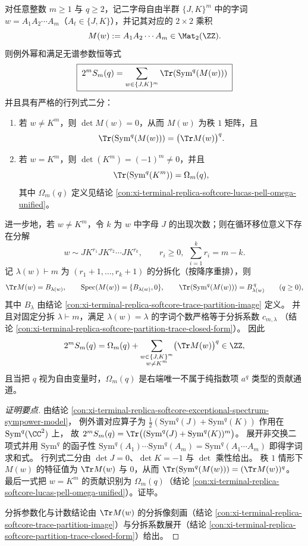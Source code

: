 \begin{conclusion}\label{con:xi-terminal-replica-softcore-exceptional-power-sum-word-trace-sympower}
对任意整数 \(m\ge 1\) 与 \(q\ge 2\)，记二字母自由半群 \(\{J,K\}^m\) 中的字词
\(w=A_1A_2\cdots A_m\)（\(A_t\in\{J,K\}\)），并记其对应的 \(2\times 2\) 乘积
\[
M(w):=A_1A_2\cdots A_m\in \Mat_{2}(\ZZ).
\]
则例外幂和满足无谱参数恒等式
\[
\boxed{\;
2^m S_m(q)=\sum_{w\in\{J,K\}^m}\Tr\!\left(\mathrm{Sym}^q(M(w))\right)\;}
\]
并且具有严格的行列式二分：
\begin{enumerate}
  \item 若 \(w\neq K^m\)，则 \(\det M(w)=0\)，从而 \(M(w)\) 为秩 \(1\) 矩阵，且
  \[
  \Tr\!\left(\mathrm{Sym}^q(M(w))\right)=\bigl(\Tr M(w)\bigr)^q.
  \]
  \item 若 \(w=K^m\)，则 \(\det(K^m)=(-1)^m\neq 0\)，并且
  \[
  \Tr\!\left(\mathrm{Sym}^q(K^m)\right)=\Omega_m(q),
  \]
  其中 \(\Omega_m(q)\) 定义见结论 \ref{con:xi-terminal-replica-softcore-lucas-pell-omega-unified}。
\end{enumerate}
进一步地，若 \(w\neq K^m\)，令 \(k\) 为 \(w\) 中字母 \(J\) 的出现次数；则在循环移位意义下存在分解
\[
w\sim JK^{r_1}JK^{r_2}\cdots JK^{r_k},
\qquad
r_i\ge 0,\ \ \sum_{i=1}^{k}r_i=m-k.
\]
记 \(\lambda(w)\vdash m\) 为 \((r_1+1,\dots,r_k+1)\) 的分拆化（按降序重排），则
\[
\Tr M(w)=B_{\lambda(w)},
\qquad
\mathrm{Spec}(M(w))=\{B_{\lambda(w)},0\},
\qquad
\Tr\!\left(\mathrm{Sym}^q(M(w))\right)=B_{\lambda(w)}^{\,q}\qquad(q\ge 0),
\]
其中 \(B_\lambda\) 由结论 \ref{con:xi-terminal-replica-softcore-trace-partition-image} 定义。
并且对固定分拆 \(\lambda\vdash m\)，满足 \(\lambda(w)=\lambda\) 的字词个数严格等于分拆系数 \(c_{m,\lambda}\)
（结论 \ref{con:xi-terminal-replica-softcore-partition-trace-closed-form}）。
因此
\[
2^m S_m(q)=\Omega_m(q)+\sum_{\substack{w\in\{J,K\}^m\\ w\neq K^m}}\bigl(\Tr M(w)\bigr)^q\in\ZZ,
\]
且当把 \(q\) 视为自由变量时，\(\Omega_m(q)\) 是右端唯一不属于纯指数项 \(a^q\) 类型的贡献通道。
\end{conclusion}
\begin{proof}[证明要点]
由结论 \ref{con:xi-terminal-replica-softcore-exceptional-spectrum-sympower-model}，
例外谱对应算子为 \(\tfrac12(\mathrm{Sym}^q(J)+\mathrm{Sym}^q(K))\) 作用在 \(\mathrm{Sym}^q(\CC^2)\) 上，
故
\(
2^m S_m(q)=\Tr\bigl((\mathrm{Sym}^q(J)+\mathrm{Sym}^q(K))^m\bigr)
\)。
展开非交换二项式并用 \(\mathrm{Sym}^q\) 的函子性
\(\mathrm{Sym}^q(A_1)\cdots \mathrm{Sym}^q(A_m)=\mathrm{Sym}^q(A_1\cdots A_m)\)
即得字词求和式。
行列式二分由 \(\det J=0\)、\(\det K=-1\) 与 \(\det\) 乘性给出。
秩 \(1\) 情形下 \(M(w)\) 的特征值为 \(\Tr M(w)\) 与 \(0\)，从而
\(\Tr(\mathrm{Sym}^q(M(w)))=(\Tr M(w))^q\)。
最后一式把 \(w=K^m\) 的贡献识别为 \(\Omega_m(q)\)（结论 \ref{con:xi-terminal-replica-softcore-lucas-pell-omega-unified}）。证毕。
\par
分拆参数化与计数结论由 \(\Tr M(w)\) 的分拆像刻画（结论 \ref{con:xi-terminal-replica-softcore-trace-partition-image}）与分拆系数展开（结论 \ref{con:xi-terminal-replica-softcore-partition-trace-closed-form}）给出。
\end{proof}
